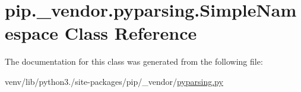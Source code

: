 \hypertarget{classpip_1_1__vendor_1_1pyparsing_1_1SimpleNamespace}{}\section{pip.\+\_\+vendor.\+pyparsing.\+Simple\+Namespace Class Reference}
\label{classpip_1_1__vendor_1_1pyparsing_1_1SimpleNamespace}


The documentation for this class was generated from the following file\+:\begin{DoxyCompactItemize}
\item 
venv/lib/python3./site-\/packages/pip/\+\_\+vendor/\hyperlink{pip_2__vendor_2pyparsing_8py}{pyparsing.\+py}\end{DoxyCompactItemize}

